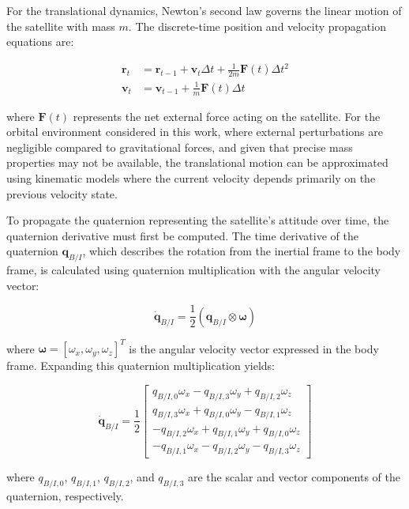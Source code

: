 For the translational dynamics, Newton's second law governs the linear motion of the satellite with mass $m$. The discrete-time position and velocity propagation equations are:

\begin{align}
\mathbf{r}_t &= \mathbf{r}_{t-1} + \mathbf{v}_t\Delta t + \frac{1}{2m}\mathbf{F}(t)\Delta t^2 \\
\mathbf{v}_t &= \mathbf{v}_{t-1} + \frac{1}{m}\mathbf{F}(t)\Delta t
\end{align}

\noindent where $\mathbf{F}(t)$ represents the net external force acting on the satellite. For the orbital environment 
considered in this work, where external perturbations are negligible compared to gravitational forces, and given that 
precise mass properties may not be available, the translational motion can be approximated using kinematic models where 
the current velocity depends primarily on the previous velocity state.

To propagate the quaternion representing the satellite's attitude over time, the quaternion derivative must first be computed.
 The time derivative of the quaternion $\mathbf{q}_{B/I}$, which describes the rotation from the inertial frame to the body frame,
is calculated using quaternion multiplication with the angular velocity vector:

\begin{equation}
\dot{\mathbf{q}}_{B/I} = \frac{1}{2}(\mathbf{q}_{B/I} \otimes \boldsymbol{\omega})
\end{equation}

\noindent where $\boldsymbol{\omega} = [\omega_x, \omega_y, \omega_z]^T$ is the angular velocity vector expressed in the body frame. 
Expanding this quaternion multiplication yields:

\begin{equation}
\dot{\mathbf{q}}_{B/I} = \frac{1}{2}
\begin{bmatrix}
q_{B/I,0} \omega_x - q_{B/I,3} \omega_y + q_{B/I,2} \omega_z \\
q_{B/I,3} \omega_x + q_{B/I,0} \omega_y - q_{B/I,1} \omega_z \\
-q_{B/I,2} \omega_x + q_{B/I,1} \omega_y + q_{B/I,0} \omega_z \\
-q_{B/I,1} \omega_x - q_{B/I,2} \omega_y - q_{B/I,3} \omega_z
\end{bmatrix}
\end{equation}

\noindent where $q_{B/I,0}$, $q_{B/I,1}$, $q_{B/I,2}$, and $q_{B/I,3}$ are the scalar and vector components of the quaternion, respectively.

